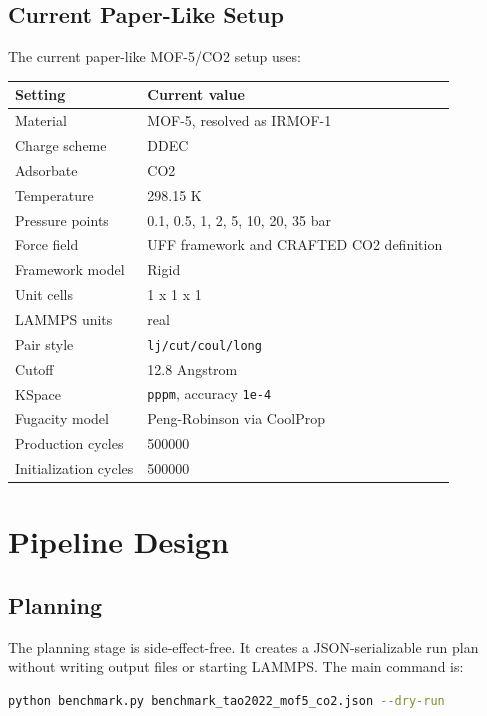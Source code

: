 \documentclass[11pt,a4paper]{article}
\begin{document}
\subsection{Current Paper-Like Setup}

The current paper-like MOF-5/CO2 setup uses:

\begin{longtable}{p{}p{}}
\toprule
\textbf{Setting} & \textbf{Current value} \\
\midrule
Material & MOF-5, resolved as IRMOF-1 \\
Charge scheme & DDEC \\
Adsorbate & CO2 \\
Temperature & 298.15 K \\
Pressure points & 0.1, 0.5, 1, 2, 5, 10, 20, 35 bar \\
Force field & UFF framework and CRAFTED CO2 definition \\
Framework model & Rigid \\
Unit cells & 1 x 1 x 1 \\
LAMMPS units & real \\
Pair style & \texttt{lj/cut/coul/long} \\
Cutoff & 12.8 Angstrom \\
KSpace & \texttt{pppm}, accuracy \texttt{1e-4} \\
Fugacity model & Peng-Robinson via CoolProp \\
Production cycles & 500000 \\
Initialization cycles & 500000 \\
\bottomrule
\end{longtable}

\section{Pipeline Design}

\subsection{Planning}

The planning stage is side-effect-free.
It creates a JSON-serializable run plan without writing output files or starting LAMMPS.
The main command is:

\begin{lstlisting}[language=bash]
python benchmark.py benchmark_tao2022_mof5_co2.json --dry-run
\end{lstlisting}
\end{document}
